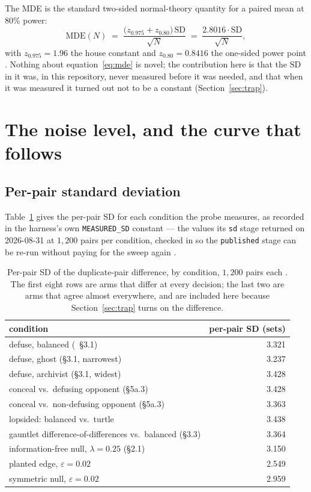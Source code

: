 \documentclass[11pt]{article}
\newcommand{\code}[1]{\texttt{#1}}
\begin{document}
The MDE is the standard two-sided normal-theory quantity for a paired mean at 80\% power:
\begin{equation}
\label{eq:mde}
\mathrm{MDE}(N) \;=\; \frac{\bigl(z_{0.975} + z_{0.80}\bigr)\,\mathrm{SD}}{\sqrt{N}}
\;=\; \frac{2.8016 \cdot \mathrm{SD}}{\sqrt{N}} ,
\end{equation}
with $z_{0.975} = 1.96$ the house constant and $z_{0.80} = 0.8416$ the one-sided power point
\cite{probefloor, cohen}. Nothing about equation~\eqref{eq:mde} is novel; the contribution here is
that the $\mathrm{SD}$ in it was, in this repository, never measured before it was needed, and that
when it was measured it turned out not to be a constant (Section~\ref{sec:trap}).

\section{The noise level, and the curve that follows}
\label{sec:noise}

\subsection{Per-pair standard deviation}

Table~\ref{tab:sd} gives the per-pair SD for each condition the probe measures, as recorded in the
harness's own \code{MEASURED\_SD} constant --- the values its \code{sd} stage returned on
2026-08-31 at $1{,}200$ pairs per condition, checked in so the \code{published} stage can be re-run
without paying for the sweep again \cite{probefloor}.

\begin{table}[ht]
\centering
\caption{Per-pair SD of the duplicate-pair difference, by condition, $1{,}200$ pairs each
\cite{probefloor}. The first eight rows are arms that differ at every decision; the last two are
arms that agree almost everywhere, and are included here because Section~\ref{sec:trap} turns on
the difference.}
\label{tab:sd}
\small
\begin{tabular}{lr}
\toprule
condition & per-pair SD (sets) \\
\midrule
defuse, balanced (\cite{concession}~\S3.1) & 3.321 \\
defuse, ghost (\S3.1, narrowest) & 3.237 \\
defuse, archivist (\S3.1, widest) & 3.428 \\
conceal vs.\ defusing opponent (\S5a.3) & 3.428 \\
conceal vs.\ non-defusing opponent (\S5a.3) & 3.363 \\
lopsided: balanced vs.\ turtle & 3.438 \\
gauntlet difference-of-differences vs.\ balanced (\S3.3) & 3.364 \\
information-free null, $\lambda = 0.25$ (\S2.1) & 3.150 \\
\midrule
planted edge, $\varepsilon = 0.02$ & 2.549 \\
symmetric null, $\varepsilon = 0.02$ & 2.959 \\
\bottomrule
\end{tabular}
\end{table}
\end{document}
